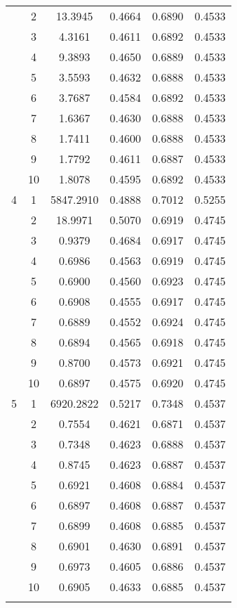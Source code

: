 \begin{longtable}{|c|c|c|c|c|c|}
  & 2 & 13.3945 & 0.4664 & 0.6890 & 0.4533 \\
  & 3 & 4.3161 & 0.4611 & 0.6892 & 0.4533 \\
  & 4 & 9.3893 & 0.4650 & 0.6889 & 0.4533 \\
  & 5 & 3.5593 & 0.4632 & 0.6888 & 0.4533 \\
  & 6 & 3.7687 & 0.4584 & 0.6892 & 0.4533 \\
  & 7 & 1.6367 & 0.4630 & 0.6888 & 0.4533 \\
  & 8 & 1.7411 & 0.4600 & 0.6888 & 0.4533 \\
  & 9 & 1.7792 & 0.4611 & 0.6887 & 0.4533 \\
  & 10 & 1.8078 & 0.4595 & 0.6892 & 0.4533 \\
\hline
4 & 1 & 5847.2910 & 0.4888 & 0.7012 & 0.5255 \\
  & 2 & 18.9971 & 0.5070 & 0.6919 & 0.4745 \\
  & 3 & 0.9379 & 0.4684 & 0.6917 & 0.4745 \\
  & 4 & 0.6986 & 0.4563 & 0.6919 & 0.4745 \\
  & 5 & 0.6900 & 0.4560 & 0.6923 & 0.4745 \\
  & 6 & 0.6908 & 0.4555 & 0.6917 & 0.4745 \\
  & 7 & 0.6889 & 0.4552 & 0.6924 & 0.4745 \\
  & 8 & 0.6894 & 0.4565 & 0.6918 & 0.4745 \\
  & 9 & 0.8700 & 0.4573 & 0.6921 & 0.4745 \\
  & 10 & 0.6897 & 0.4575 & 0.6920 & 0.4745 \\
\hline
5 & 1 & 6920.2822 & 0.5217 & 0.7348 & 0.4537 \\
  & 2 & 0.7554 & 0.4621 & 0.6871 & 0.4537 \\
  & 3 & 0.7348 & 0.4623 & 0.6888 & 0.4537 \\
  & 4 & 0.8745 & 0.4623 & 0.6887 & 0.4537 \\
  & 5 & 0.6921 & 0.4608 & 0.6884 & 0.4537 \\
  & 6 & 0.6897 & 0.4608 & 0.6887 & 0.4537 \\
  & 7 & 0.6899 & 0.4608 & 0.6885 & 0.4537 \\
  & 8 & 0.6901 & 0.4630 & 0.6891 & 0.4537 \\
  & 9 & 0.6973 & 0.4605 & 0.6886 & 0.4537 \\
  & 10 & 0.6905 & 0.4633 & 0.6885 & 0.4537 \\
\hline
\label{table:mlp1hyp}
\end{longtable}

